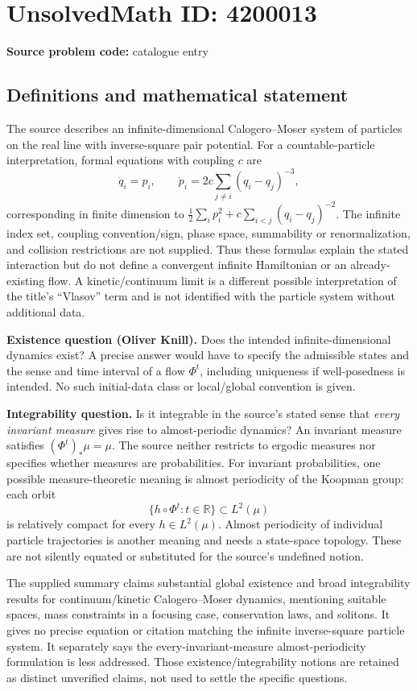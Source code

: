 \documentclass[11pt]{article}
\newcommand{\R}{\mathbb{R}}
\begin{document}
\section*{UnsolvedMath ID: 4200013}
\textbf{Source problem code:} catalogue entry
\subsection{Definitions and mathematical statement}
The source describes an infinite-dimensional Calogero--Moser system of particles on the real line with inverse-square pair potential. For a countable-particle interpretation, formal equations with coupling $c$ are
\[
 \dot q_i=p_i,\qquad
 \dot p_i=2c\sum_{j\ne i}(q_i-q_j)^{-3},
\]
corresponding in finite dimension to $\tfrac12\sum_i p_i^2+c\sum_{i<j}(q_i-q_j)^{-2}$. The infinite index set, coupling convention/sign, phase space, summability or renormalization, and collision restrictions are not supplied. Thus these formulas explain the stated interaction but do not define a convergent infinite Hamiltonian or an already-existing flow. A kinetic/continuum limit is a different possible interpretation of the title's ``Vlasov'' term and is not identified with the particle system without additional data.

\textbf{Existence question (Oliver Knill).} Does the intended infinite-dimensional dynamics exist? A precise answer would have to specify the admissible states and the sense and time interval of a flow $\Phi^t$, including uniqueness if well-posedness is intended. No such initial-data class or local/global convention is given.

\textbf{Integrability question.} Is it integrable in the source's stated sense that \emph{every invariant measure} gives rise to almost-periodic dynamics? An invariant measure satisfies $(\Phi^t)_*\mu=\mu$. The source neither restricts to ergodic measures nor specifies whether measures are probabilities. For invariant probabilities, one possible measure-theoretic meaning is almost periodicity of the Koopman group: each orbit
\[
 \{h\circ\Phi^t:t\in\R\}\subset L^2(\mu)
\]
is relatively compact for every $h\in L^2(\mu)$. Almost periodicity of individual particle trajectories is another meaning and needs a state-space topology. These are not silently equated or substituted for the source's undefined notion.

The supplied summary claims substantial global existence and broad integrability results for continuum/kinetic Calogero--Moser dynamics, mentioning suitable spaces, mass constraints in a focusing case, conservation laws, and solitons. It gives no precise equation or citation matching the infinite inverse-square particle system. It separately says the every-invariant-measure almost-periodicity formulation is less addressed. Those existence/integrability notions are retained as distinct unverified claims, not used to settle the specific questions.
\end{document}
